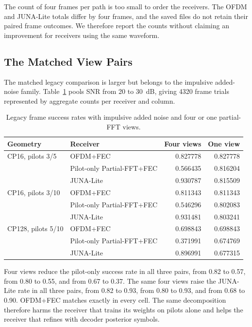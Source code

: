 \documentclass[11pt]{article}
\begin{document}
The count of four frames per path is too small to order the receivers.
The OFDM and JUNA-Lite totals differ by four frames, and the saved files do not
retain their paired frame outcomes.  We therefore report the counts without
claiming an improvement for receivers using the same waveform.

\subsection{The Matched View Pairs}

The matched legacy comparison is larger but belongs to the impulsive added-noise
family.  Table~\ref{tab:views} pools SNR from 20 to 30~dB, giving 4320
frame trials represented by aggregate counts per receiver and column.

\begin{table}[ht]
\centering
\caption{Legacy frame success rates with impulsive added noise and four or one partial-FFT views.}
\label{tab:views}
\begin{tabular}{@{}llrr@{}}
\toprule
Geometry & Receiver & Four views & One view \\
\midrule
CP16, pilots 3/5
& OFDM+FEC & 0.827778 & 0.827778 \\
& Pilot-only Partial-FFT+FEC & 0.566435 & 0.816204 \\
& JUNA-Lite & 0.930787 & 0.815509 \\
\addlinespace
CP16, pilots 3/10
& OFDM+FEC & 0.811343 & 0.811343 \\
& Pilot-only Partial-FFT+FEC & 0.546296 & 0.802083 \\
& JUNA-Lite & 0.931481 & 0.803241 \\
\addlinespace
CP128, pilots 5/10
& OFDM+FEC & 0.698843 & 0.698843 \\
& Pilot-only Partial-FFT+FEC & 0.371991 & 0.674769 \\
& JUNA-Lite & 0.896991 & 0.677315 \\
\bottomrule
\end{tabular}
\end{table}

Four views reduce the pilot-only success rate in all three pairs, from 0.82
to 0.57, from 0.80 to 0.55, and from 0.67 to 0.37.  The same four views
raise the JUNA-Lite rate in all three pairs, from 0.82 to 0.93, from 0.80 to
0.93, and from 0.68 to 0.90.  OFDM+FEC matches exactly in every cell.  The
same decomposition therefore harms the receiver that trains its weights on
pilots alone and helps the receiver that refines with decoder posterior
symbols.
\end{document}
